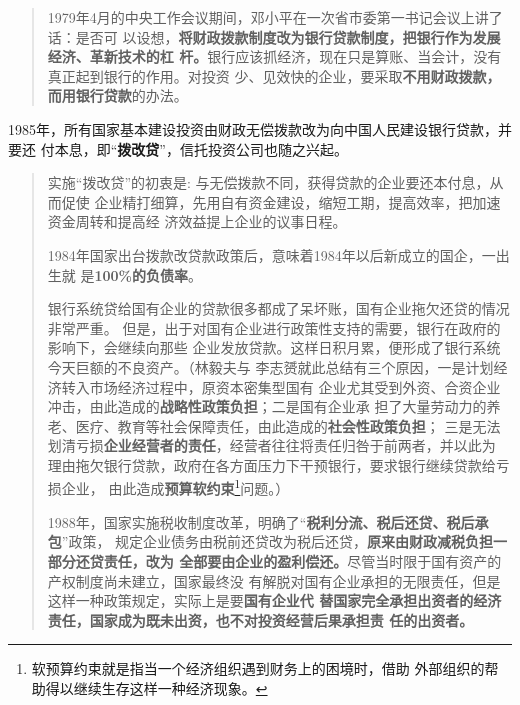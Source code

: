 \begin{quotation}
  1979年4月的中央工作会议期间，邓小平在一次省市委第一书记会议上讲了话：是否可
  以设想，\textbf{将财政拨款制度改为银行贷款制度，把银行作为发展经济、革新技术的杠
    杆。}银行应该抓经济，现在只是算账、当会计，没有真正起到银行的作用。对投资
  少、见效快的企业，要采取\textbf{不用财政拨款，而用银行贷款}的办法。\cite{bogaidai30}
\end{quotation}

1985年，所有国家基本建设投资由财政无偿拨款改为向中国人民建设银行贷款，并要还
付本息，即“\textbf{拨改贷}”，信托投资公司也随之兴起。
\begin{quotation}
  实施“拨改贷”的初衷是: 与无偿拨款不同，获得贷款的企业要还本付息，从而促使
  企业精打细算，先用自有资金建设，缩短工期，提高效率，把加速资金周转和提高经
  济效益提上企业的议事日程。

  1984年国家出台拨款改贷款政策后，意味着1984年以后新成立的国企，一出生就
  是\textbf{100\%的负债率}。\cite{bogaidaizhaizhuangu}


  银行系统贷给国有企业的贷款很多都成了呆坏账，国有企业拖欠还贷的情况非常严重。
  但是，出于对国有企业进行政策性支持的需要，银行在政府的影响下，会继续向那些
  企业发放贷款。这样日积月累，便形成了银行系统今天巨额的不良资产。（林毅夫与
  李志赟就此总结有三个原因，一是计划经济转入市场经济过程中，原资本密集型国有
  企业尤其受到外资、合资企业冲击，由此造成的\textbf{战略性政策负担}；二是国有企业承
  担了大量劳动力的养老、医疗、教育等社会保障责任，由此造成的\textbf{社会性政策负担}；
  三是无法划清亏损\textbf{企业经营者的责任}，经营者往往将责任归咎于前两者，并以此为
  理由拖欠银行贷款，政府在各方面压力下干预银行，要求银行继续贷款给亏损企业，
  由此造成\textbf{预算软约束}\footnote{软预算约束就是指当一个经济组织遇到财务上的困境时，借助
    外部组织的帮助得以继续生存这样一种经济现象。}问题。）\cite{guoyoujinrong}

  1988年，国家实施税收制度改革，明确了“\textbf{税利分流、税后还贷、税后承包}”政策，
  规定企业债务由税前还贷改为税后还贷，\textbf{原来由财政减税负担一部分还贷责任，改为
  全部要由企业的盈利偿还。}尽管当时限于国有资产的产权制度尚未建立，国家最终没
  有解脱对国有企业承担的无限责任，但是这样一种政策规定，实际上是要\textbf{国有企业代
  替国家完全承担出资者的经济责任，国家成为既未出资，也不对投资经营后果承担责
  任的出资者。}\cite{bogaidai30}
\end{quotation}

